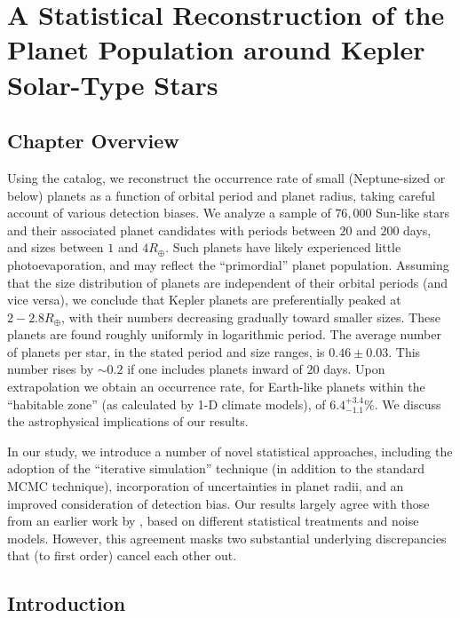 \chapter[Statistical Reconstruction of Kepler Planets]{A Statistical Reconstruction of the Planet Population around Kepler Solar-Type Stars}
\label{chap:Stats}

\section{Chapter Overview}

  Using the \citet{Ramirez2014} \kep catalog, we reconstruct the
  occurrence rate of small (Neptune-sized or below) planets as a
  function of orbital period and planet radius, taking careful account
  of various detection biases. We analyze a sample of $76,000$
  Sun-like stars and their associated planet candidates with periods
  between $20$ and $200$ days, and sizes between $1$ and $4
  R_\oplus$. Such planets have likely experienced little
  photoevaporation, and may reflect the ``primordial'' planet
  population. Assuming that the size distribution of planets are
  independent of their orbital periods (and vice versa), we
  conclude that Kepler planets are preferentially peaked at $2-2.8
  R_\oplus$, with their numbers decreasing gradually toward smaller
  sizes. These planets are found roughly uniformly in logarithmic
  period. The average number of planets per star, in the stated period
  and size ranges, is $0.46 \pm 0.03$. This number rises by $\sim
    0.2$ if one includes planets inward of $20$ days.
  Upon extrapolation we obtain an occurrence rate, for
    Earth-like planets within the ``habitable zone'' (as calculated by
  1-D climate models), of $6.4^{+3.4}_{-1.1}\%$. We discuss the
  astrophysical implications of our results.

  In our study, we introduce a number of novel statistical approaches,
  including the adoption of the ``iterative simulation'' technique (in
  addition to the standard MCMC technique), incorporation of
  uncertainties in planet radii, and an improved consideration of
  detection bias. Our results largely agree with those from an earlier
  work by \citet{Petigura2013}, based on different statistical
  treatments and noise models. However, this agreement masks two 
  substantial underlying discrepancies that (to first order) cancel each 
  other out.

\section{Introduction}
\label{sec:introduction}

